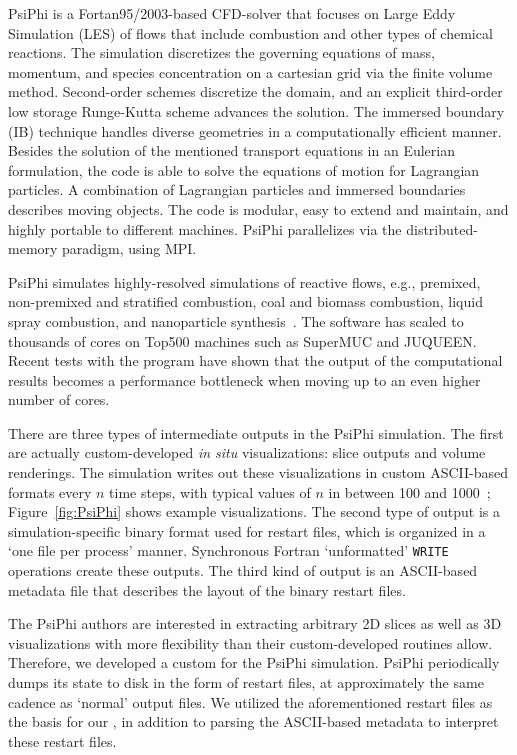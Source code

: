 PsiPhi is a Fortan95/2003-based CFD-solver that focuses on Large Eddy
Simulation (LES) of flows that include combustion and other types of
chemical reactions.  The simulation discretizes the governing equations
of mass, momentum, and species concentration on a cartesian grid via
the finite volume method.  Second-order schemes discretize the domain,
and an explicit third-order low storage Runge-Kutta scheme advances
the solution.  The immersed boundary (IB) technique handles diverse
geometries in a computationally efficient manner.  Besides the solution
of the mentioned transport equations in an Eulerian formulation, the
code is able to solve the equations of motion for Lagrangian particles.
A combination of Lagrangian particles and immersed boundaries describes
moving objects.  The code is modular, easy to extend and maintain, and
highly portable to different machines.  PsiPhi parallelizes via the
distributed-memory paradigm, using MPI.


PsiPhi simulates highly-resolved simulations of reactive flows, e.g.,
premixed, non-premixed and stratified combustion, coal and biomass
combustion, liquid spray combustion, and nanoparticle
synthesis~\cite{Pettit2011PCI, Ma2013CTM, CavalloMarincola2013PCI}.
The software has scaled to thousands of cores on Top500 machines such
as SuperMUC and JUQUEEN.  Recent tests with the program have shown
that the output of the computational results becomes a performance
bottleneck when moving up to an even higher number of cores.

There are three types of intermediate outputs in the PsiPhi simulation.
The first
are actually custom-developed \textit{in situ} visualizations: slice
outputs and volume renderings.  The simulation writes out these
visualizations in custom ASCII-based formats every $n$ time steps, with
typical values of $n$ in
between 100 and 1000~\cite{Proch2014CNF};
Figure~\ref{fig:PsiPhi} shows example visualizations.  The second
type of output is a simulation-specific binary format used for
restart files, which is organized in a `one file per process' manner.
Synchronous Fortran `unformatted'
\texttt{WRITE} operations create these outputs.  The third kind of
output is an ASCII-based metadata file that describes the layout of
the binary restart files.

The PsiPhi authors are interested in extracting arbitrary 2D slices
as well as 3D visualizations with more flexibility than their
custom-developed routines allow.
Therefore, we developed a custom \freeprocessor{} for the PsiPhi
simulation.  PsiPhi periodically dumps its state to disk in the form
of restart files, at approximately the same cadence as `normal' output
files.  We utilized the aforementioned restart files as the basis for our
\freeprocessor{}, in addition to parsing the ASCII-based metadata to interpret
these restart files.

